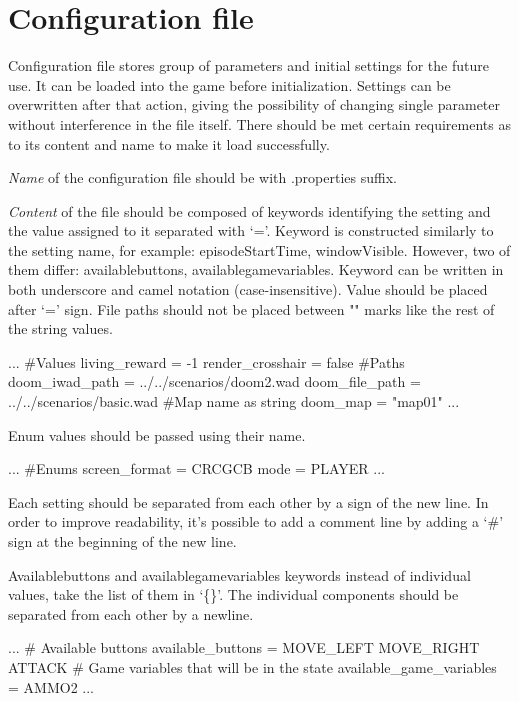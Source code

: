 \documentclass[english,bachelor,a4paper,twoside]{ppfcmthesis}
\begin{document}
\section{Configuration file}\label{sec:configuration_file}

	Configuration file stores group of parameters and initial settings for the future use. It can be loaded into the game before initialization. Settings can be overwritten after that action, giving the possibility of changing single parameter without interference in the file itself. There should be met certain requirements as to its content and name to make it load successfully.


	\emph{Name} of the configuration file should be with .properties suffix.

	\emph{Content} of the file should be composed of keywords identifying the setting and the value assigned to it separated with `='. Keyword is constructed similarly to the setting name, for example: episodeStartTime, windowVisible. However, two of them differ: availablebuttons, availablegamevariables.
Keyword can be written in both underscore and camel notation (case-insensitive). 
	Value should be placed after `=' sign. File paths should not be placed between "" marks like the rest of the string values.
\begin{pblock}
...
#Values
living_reward = -1
render_crosshair = false
#Paths
doom_iwad_path = ../../scenarios/doom2.wad
doom_file_path = ../../scenarios/basic.wad
#Map name as string
doom_map = "map01"
...
\end{pblock}

	Enum values should be passed using their name.


\begin{pblock}
...
#Enums
screen_format = CRCGCB
mode = PLAYER
...
\end{pblock}

	Each setting should be separated from each other by a sign of the new line. In order to improve readability, it's possible to add a comment line by adding a `\#' sign at the beginning of the new line.

Availablebuttons and availablegamevariables keywords instead of individual values, take the list of them in `\{\}'. The individual components should be separated from each other by a newline.
\begin{pblock}
...
# Available buttons
available_buttons = 
	{ 
		MOVE_LEFT 
		MOVE_RIGHT 
		ATTACK 
	}
# Game variables that will be in the state
available_game_variables = { AMMO2}
...
\end{pblock}
\end{document}
